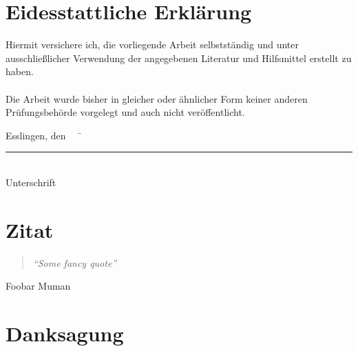 
\chapter*{Eidesstattliche Erklärung}

Hiermit versichere ich, die vorliegende Arbeit selbstständig und unter ausschließlicher Verwendung der angegebenen Literatur und Hilfsmittel erstellt zu haben.\\\\
Die Arbeit wurde bisher in gleicher oder ähnlicher Form keiner anderen Prüfungsbehörde vorgelegt und auch nicht veröffentlicht.\\
\begin{tabbing}
          Esslingen, den \workDatum ~~	\= \rule{5cm}{0.3mm}\\
                                                                                                    \> Unterschrift
\end{tabbing}
%
\newpage
%
\chapter*{Zitat} %
\begin{center}
\begin{minipage}{12cm}
\begin{quotation}
\textit{\enquote{Some fancy quote}}
\end{quotation}
\hfill \textsf Foobar Muman
\end{minipage}
\end{center}
\newpage{}
\chapter*{Danksagung} %

\newpage
